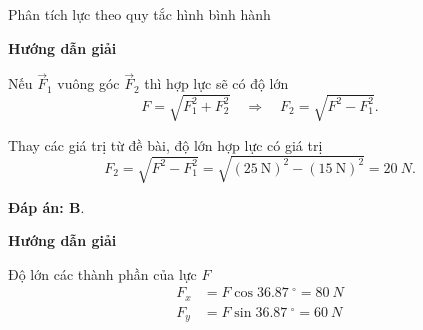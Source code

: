 \begin{dang}{Phân tích lực theo quy tắc hình bình hành}
	{	\begin{center}
			\textbf{Hướng dẫn giải}
		\end{center}
		
		Nếu $\vec{F}_1$ vuông góc $\vec{F}_2$ thì hợp lực sẽ có độ lớn 
		$$F=\sqrt{F_1^2+F_2^2} \quad\Rightarrow\quad F_2=\sqrt{F^2-F_1^2}.$$
		
		Thay các giá trị từ đề bài, độ lớn hợp lực có giá trị 		
		$$F_2 = \sqrt {F^2 - F_1^2} =\sqrt{(\SI{25}{\newton})^2-(\SI{15}{\newton})^2}= \SI{20}{N}.$$
		
		\textbf{Đáp án: B}.
	}
	{	\begin{center}
			\textbf{Hướng dẫn giải}
		\end{center}
		
		
		
		Độ lớn các thành phần của lực $F$
		\begin{align*}
			F_{x} &= F\cos \SI{36,87}{^\circ} = \SI{80}{N}\\
			F_{y}&= F\sin\SI{36,87}{^\circ} = \SI{60}{N}
		\end{align*}
	}
\end{dang}

